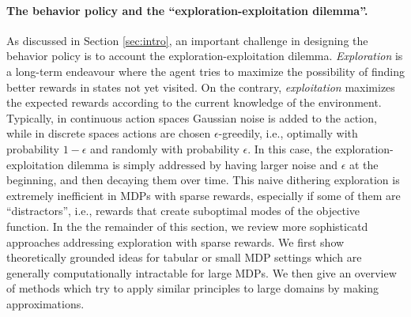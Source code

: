 \documentclass{article}
\begin{document}
\paragraph{The behavior policy and the ``exploration-exploitation dilemma''.}
As discussed in Section \ref{sec:intro}, an important challenge in designing the behavior policy is to account the exploration-exploitation dilemma. 
\textit{Exploration} is a long-term endeavour where the agent tries to maximize the possibility of finding better rewards in states not yet visited. On the contrary, \textit{exploitation} maximizes the expected rewards according to the current knowledge of the environment.
Typically, in continuous action spaces Gaussian noise is added to the action, while in discrete spaces actions are chosen $\epsilon$-greedily, i.e., optimally with probability $1\! -\! \epsilon$ and randomly with probability $\epsilon$. In this case, the exploration-exploitation dilemma is simply addressed by having larger noise and $\epsilon$ at the beginning, and then decaying them over time. 
This naive dithering exploration is extremely inefficient in MDPs with sparse rewards, especially if some of them are ``distractors'', i.e., rewards that create suboptimal modes of the objective function. In the the remainder of this section, we review more sophisticatd approaches addressing exploration with sparse rewards. We first show theoretically grounded ideas for tabular or small MDP settings which are generally computationally intractable for large MDPs. We then give an overview of methods which try to apply similar principles to large domains by making approximations.
\end{document}
